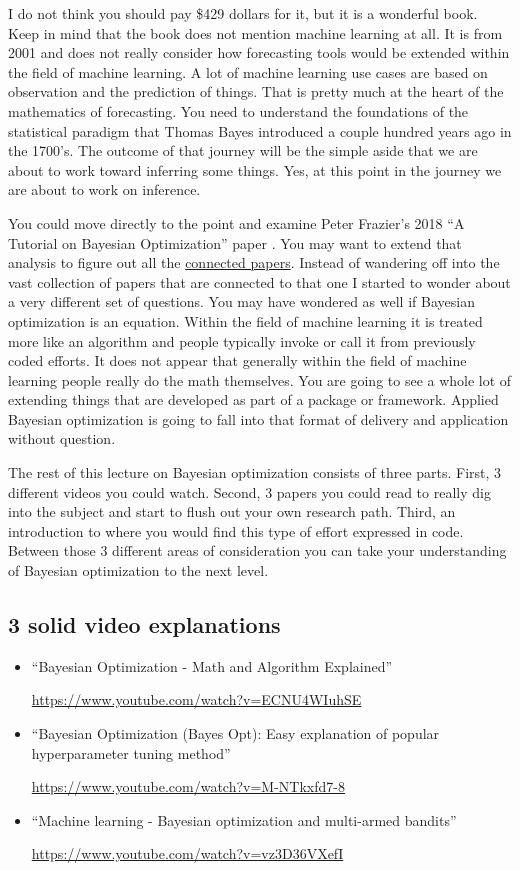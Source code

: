 \documentclass{article}
\begin{document}
I do not think you should pay \$429 dollars for it, but it is a wonderful book. Keep in mind that the book does not mention machine learning at all. It is from 2001 and does not really consider how forecasting tools would be extended within the field of machine learning. A lot of machine learning use cases are based on observation and the prediction of things. That is pretty much at the heart of the mathematics of forecasting. You need to understand the foundations of the statistical paradigm that Thomas Bayes introduced a couple hundred years ago in the 1700’s. The outcome of that journey will be the simple aside that we are about to work toward inferring some things. Yes, at this point in the journey we are about to work on inference. 

You could move directly to the point and examine Peter Frazier’s 2018 “A Tutorial on Bayesian Optimization” paper \cite{frazier2018tutorial}. You may want to extend that analysis to figure out all the \href{https://www.connectedpapers.com/main/c27078d60737ea10e8ca4f05acd114fef29c8276/graph}{connected papers}. Instead of wandering off into the vast collection of papers that are connected to that one I started to wonder about a very different set of questions. You may have wondered as well if Bayesian optimization is an equation. Within the field of machine learning it is treated more like an algorithm and people typically invoke or call it from previously coded efforts. It does not appear that generally within the field of machine learning people really do the math themselves. You are going to see a whole lot of extending things that are developed as part of a package or framework. Applied Bayesian optimization is going to fall into that format of delivery and application without question. 

The rest of this lecture on Bayesian optimization consists of three parts. First, 3 different videos you could watch. Second, 3 papers you could read to really dig into the subject and start to flush out your own research path. Third, an introduction to where you would find this type of effort expressed in code. Between those 3 different areas of consideration you can take your understanding of Bayesian optimization to the next level. 

\subsection{3 solid video explanations}
\begin{itemize}
\item “Bayesian Optimization - Math and Algorithm Explained”

\url{https://www.youtube.com/watch?v=ECNU4WIuhSE}
\item “Bayesian Optimization (Bayes Opt): Easy explanation of popular hyperparameter tuning method” 

\url{https://www.youtube.com/watch?v=M-NTkxfd7-8}
\item “Machine learning - Bayesian optimization and multi-armed bandits” 

\url{https://www.youtube.com/watch?v=vz3D36VXefI }
\end{itemize}
\end{document}
